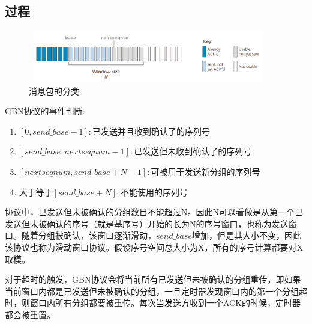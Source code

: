 \documentclass[UTF8,14pt]{article}
\numberwithin{figure}{section}
\begin{document}
\subsection{过程}
\begin{figure}[!htbp]
      \centering
      \setlength{\abovecaptionskip}{0.cm}
      \includegraphics[width=10.55cm,height=2.27cm]{figures/gbn3.png}
      \caption{消息包的分类}
\end{figure}

GBN协议的事件判断:
\begin{enumerate}
      \setlength{\parskip}{-5mm}
      \item $[0,send\_{}base-1]:$已发送并且收到确认了的序列号\\
      \item $[send\_{}base,nextseqnum - 1]:$已发送但未收到确认了的序列号\\
      \item $[nextseqnum, send\_{}base + N - 1]:$可被用于发送新分组的序列号\\
      \item 大于等于$[send\_{}base + N]:$不能使用的序列号\\
\end{enumerate}

协议中，已发送但未被确认的分组数目不能超过N。因此N可以看做是从第一个已发送但未被确认的序号（就是基序号）开始的长为N的序号窗口，也称为发送窗口。随着分组被确认，该窗口逐渐滑动，$send\_ base$增加，但是其大小不变，因此该协议也称为滑动窗口协议。假设序号空间总大小为X，所有的序号计算都要对X取模。

对于超时的触发，GBN协议会将当前所有已发送但未被确认的分组重传，即如果当前窗口内都是已发送但未被确认的分组，一旦定时器发现窗口内的第一个分组超时，则窗口内所有分组都要被重传。每次当发送方收到一个ACK的时候，定时器都会被重置。
\end{document}
